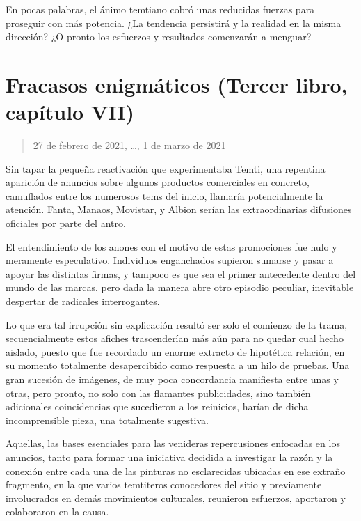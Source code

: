 \documentclass[
]{book}
\begin{document}
En pocas palabras, el ánimo temtiano cobró unas reducidas fuerzas para proseguir con más potencia. ¿La tendencia persistirá y la realidad en la misma dirección? ¿O pronto los esfuerzos y resultados comenzarán a menguar?

\hypertarget{fracasos-enigmuxe1ticos-tercer-libro-capuxedtulo-vii}{%
\section{Fracasos enigmáticos (Tercer libro, capítulo VII)}\label{fracasos-enigmuxe1ticos-tercer-libro-capuxedtulo-vii}}

\begin{quote}
27 de febrero de 2021, \ldots, 1 de marzo de 2021
\end{quote}

Sin tapar la pequeña reactivación que experimentaba Temti, una repentina aparición de anuncios sobre algunos productos comerciales en concreto, camuflados entre los numerosos tems del inicio, llamaría potencialmente la atención. Fanta, Manaos, Movistar, y Albion serían las extraordinarias difusiones oficiales por parte del antro.

El entendimiento de los anones con el motivo de estas promociones fue nulo y meramente especulativo. Individuos enganchados supieron sumarse y pasar a apoyar las distintas firmas, y tampoco es que sea el primer antecedente dentro del mundo de las marcas, pero dada la manera abre otro episodio peculiar, inevitable despertar de radicales interrogantes.

Lo que era tal irrupción sin explicación resultó ser solo el comienzo de la trama, secuencialmente estos afiches trascenderían más aún para no quedar cual hecho aislado, puesto que fue recordado un enorme extracto de hipotética relación, en su momento totalmente desapercibido como respuesta a un hilo de pruebas. Una gran sucesión de imágenes, de muy poca concordancia manifiesta entre unas y otras, pero pronto, no solo con las flamantes publicidades, sino también adicionales coincidencias que sucedieron a los reinicios, harían de dicha incomprensible pieza, una totalmente sugestiva.

Aquellas, las bases esenciales para las venideras repercusiones enfocadas en los anuncios, tanto para formar una iniciativa decidida a investigar la razón y la conexión entre cada una de las pinturas no esclarecidas ubicadas en ese extraño fragmento, en la que varios temtiteros conocedores del sitio y previamente involucrados en demás movimientos culturales, reunieron esfuerzos, aportaron y colaboraron en la causa.
\end{document}
